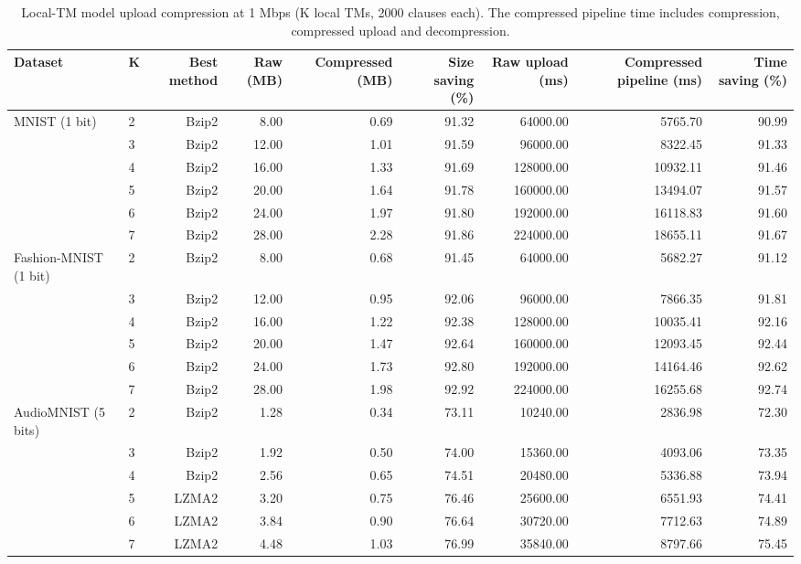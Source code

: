 \begin{table}[t]
\centering
\caption{Local-TM model upload compression at 1 Mbps (K local TMs, 2000 clauses each). The compressed pipeline time includes compression, compressed upload and decompression.}
\footnotesize
\begin{tabular}{llrrrrrrr}
\toprule
Dataset & K & Best method & Raw (MB) & Compressed (MB) & Size saving (\%) & Raw upload (ms) & Compressed pipeline (ms) & Time saving (\%) \\
\midrule
MNIST (1 bit) & 2 & Bzip2 & 8.00 & 0.69 & 91.32 & 64000.00 & 5765.70 & 90.99 \\
 & 3 & Bzip2 & 12.00 & 1.01 & 91.59 & 96000.00 & 8322.45 & 91.33 \\
 & 4 & Bzip2 & 16.00 & 1.33 & 91.69 & 128000.00 & 10932.11 & 91.46 \\
 & 5 & Bzip2 & 20.00 & 1.64 & 91.78 & 160000.00 & 13494.07 & 91.57 \\
 & 6 & Bzip2 & 24.00 & 1.97 & 91.80 & 192000.00 & 16118.83 & 91.60 \\
 & 7 & Bzip2 & 28.00 & 2.28 & 91.86 & 224000.00 & 18655.11 & 91.67 \\
Fashion-MNIST (1 bit) & 2 & Bzip2 & 8.00 & 0.68 & 91.45 & 64000.00 & 5682.27 & 91.12 \\
 & 3 & Bzip2 & 12.00 & 0.95 & 92.06 & 96000.00 & 7866.35 & 91.81 \\
 & 4 & Bzip2 & 16.00 & 1.22 & 92.38 & 128000.00 & 10035.41 & 92.16 \\
 & 5 & Bzip2 & 20.00 & 1.47 & 92.64 & 160000.00 & 12093.45 & 92.44 \\
 & 6 & Bzip2 & 24.00 & 1.73 & 92.80 & 192000.00 & 14164.46 & 92.62 \\
 & 7 & Bzip2 & 28.00 & 1.98 & 92.92 & 224000.00 & 16255.68 & 92.74 \\
AudioMNIST (5 bits) & 2 & Bzip2 & 1.28 & 0.34 & 73.11 & 10240.00 & 2836.98 & 72.30 \\
 & 3 & Bzip2 & 1.92 & 0.50 & 74.00 & 15360.00 & 4093.06 & 73.35 \\
 & 4 & Bzip2 & 2.56 & 0.65 & 74.51 & 20480.00 & 5336.88 & 73.94 \\
 & 5 & LZMA2 & 3.20 & 0.75 & 76.46 & 25600.00 & 6551.93 & 74.41 \\
 & 6 & LZMA2 & 3.84 & 0.90 & 76.64 & 30720.00 & 7712.63 & 74.89 \\
 & 7 & LZMA2 & 4.48 & 1.03 & 76.99 & 35840.00 & 8797.66 & 75.45 \\
\bottomrule
\end{tabular}
\end{table}

